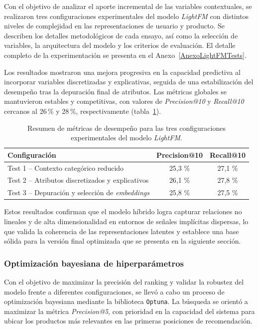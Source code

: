 Con el objetivo de analizar el aporte incremental de las variables contextuales, se realizaron tres configuraciones experimentales del modelo \textit{LightFM} con distintos niveles de complejidad en las representaciones de usuario y producto.  
Se describen los detalles metodológicos de cada ensayo, así como la selección de variables, la arquitectura del modelo y los criterios de evaluación. El detalle completo de la experimentación se presenta en el Anexo~\ref{AnexoLightFMTests}.

Los resultados mostraron una mejora progresiva en la capacidad predictiva al incorporar variables discretizadas y explicativas, seguida de una estabilización del desempeño tras la depuración final de atributos. Las métricas globales se mantuvieron estables y competitivas, con valores de \textit{Precision@10} y \textit{Recall@10} cercanos al 26\,\% y 28\,\%, respectivamente (tabla~\ref{tab:resultados_lightfm_a}).

\begin{table}[H]
	\centering
	\caption[Resultados comparativos de los ensayos con LightFM]{Resumen de métricas de desempeño para las tres configuraciones experimentales del modelo \textit{LightFM}.}
	\begin{tabular}{l c c}    
		\toprule
		\textbf{Configuración} & \textbf{Precision@10} & \textbf{Recall@10} \\
		\midrule
		Test 1 – Contexto categórico reducido & 25{,}3 \% & 27{,}1 \% \\
		Test 2 – Atributos discretizados y explicativos & 26{,}1 \% & 27{,}8 \% \\
		Test 3 – Depuración y selección de \textit{embeddings} & 25{,}8 \% & 27{,}5 \% \\
		\bottomrule
	\end{tabular}
	\label{tab:resultados_lightfm_a}
\end{table}

Estos resultados confirman que el modelo híbrido logra capturar relaciones no lineales y de alta dimensionalidad en entornos de señales implícitas dispersas, lo que valida la coherencia de las representaciones latentes y establece una base sólida para la versión final optimizada que se presenta en la siguiente sección.

\subsubsection{Optimización bayesiana de hiperparámetros}

Con el objetivo de maximizar la precisión del ranking y validar la robustez del modelo frente a diferentes configuraciones, se llevó a cabo un proceso de optimización bayesiana mediante la biblioteca \texttt{Optuna}. La búsqueda se orientó a maximizar la métrica \textit{Precision@5}, con prioridad en la capacidad del sistema para ubicar los productos más relevantes en las primeras posiciones de recomendación.

